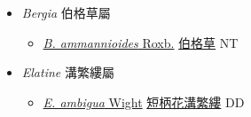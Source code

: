 
  \begin{itemize}
 \item[] \textit{Bergia} 伯格草屬
                    
  \begin{itemize}
        \item[] \href{http://www.theplantlist.org/tpl1.1/search?q=Bergia+ammannioides}{\textit{B. ammannioides} Roxb.}   \href{\detokenize{http://taibnet.sinica.edu.tw/chi/taibnet_species_list.php?T2=伯格草&T2_new_value=true&fr=y}}{伯格草} NT
  \end{itemize}
 \item[] \textit{Elatine} 溝繁縷屬
                    
  \begin{itemize}
        \item[] \href{http://www.theplantlist.org/tpl1.1/search?q=Elatine+ambigua}{\textit{E. ambigua} Wight}   \href{\detokenize{http://taibnet.sinica.edu.tw/chi/taibnet_species_list.php?T2=短柄花溝繁縷&T2_new_value=true&fr=y}}{短柄花溝繁縷} DD
  \end{itemize}
  \end{itemize}
